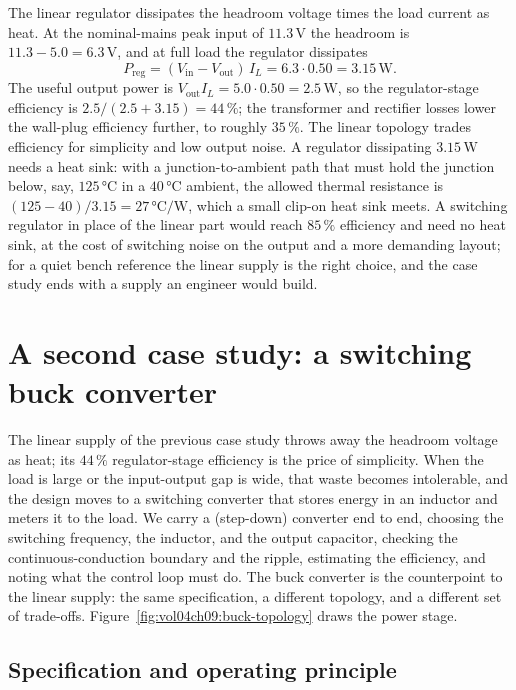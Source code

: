 The linear regulator dissipates the headroom voltage times the load
current as heat. At the nominal-mains peak input of $11.3\,\si{\volt}$
the headroom is $11.3 - 5.0 = 6.3\,\si{\volt}$, and at full load the
regulator dissipates
\[
P_{\text{reg}} = (V_{\text{in}}-V_{\text{out}})\,I_{L} = 6.3\cdot 0.50 =
3.15\,\si{\watt}.
\]
The useful output power is $V_{\text{out}}I_{L} = 5.0\cdot 0.50 =
2.5\,\si{\watt}$, so the regulator-stage efficiency is $2.5/(2.5+3.15) =
44\,\%$; the transformer and rectifier losses lower the wall-plug
efficiency further, to roughly $35\,\%$. The linear topology trades
efficiency for simplicity and low output noise. A regulator dissipating
$3.15\,\si{\watt}$ needs a heat sink: with a junction-to-ambient path
that must hold the junction below, say, $125\,\si{\celsius}$ in a
$40\,\si{\celsius}$ ambient, the allowed thermal resistance is
$(125-40)/3.15 = 27\,\si{\celsius}/\si{\watt}$, which a small clip-on
heat sink meets. A switching regulator in place of the linear part would
reach $85\,\%$ efficiency and need no heat sink, at the cost of switching
noise on the output and a more demanding layout; for a quiet bench
reference the linear supply is the right choice, and the case study ends
with a supply an engineer would build.

\section{A second case study: a switching buck converter}
\label{sec:vol04ch09:buck-case}

The linear supply of the previous case study throws away the headroom
voltage as heat; its $44\,\%$ regulator-stage efficiency is the price of
simplicity. When the load is large or the input-output gap is wide, that
waste becomes intolerable, and the design moves to a switching converter
that stores energy in an inductor and meters it to the load. We carry a
 (step-down) converter end to end, choosing the switching
frequency, the inductor, and the output capacitor, checking the
continuous-conduction boundary and the ripple, estimating the efficiency,
and noting what the control loop must do. The buck converter is the
counterpoint to the linear supply: the same specification, a different
topology, and a different set of trade-offs. Figure~\ref{fig:vol04ch09:buck-topology}
draws the power stage.



\subsection{Specification and operating principle}


